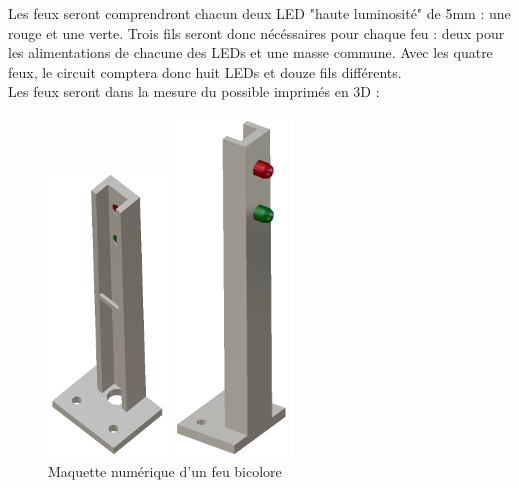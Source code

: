 		Les feux seront comprendront chacun deux LED "haute luminosité" de 5mm : une rouge et une verte. Trois fils seront donc nécéssaires pour chaque feu : deux pour les alimentations de chacune des LEDs et une masse commune. Avec les quatre feux, le circuit comptera donc huit LEDs et douze fils différents.\\
		\newpage
		Les feux seront dans la mesure du possible imprimés en 3D :\\
		\begin{figure}[ht!]
			\centering
			\begin{minipage}{0.4\textwidth}
				\raggedleft
				\includegraphics[scale=0.9]{Graphics/feu2.png}
			\end{minipage}\hfill
			\begin{minipage}{0.4\textwidth}
				\raggedright
				\includegraphics[scale=0.8]{Graphics/feu1.png}
			\end{minipage}
			\caption{Maquette numérique d'un feu bicolore}
		\end{figure}

